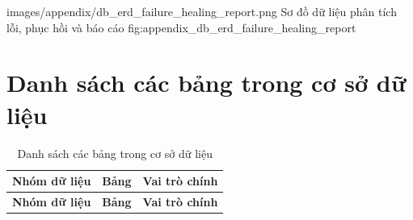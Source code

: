 \appendixERDFigure
{images/appendix/db_erd_failure_healing_report.png}
{Sơ đồ dữ liệu phân tích lỗi, phục hồi và báo cáo}
{fig:appendix_db_erd_failure_healing_report}

\clearpage

\section{Danh sách các bảng trong cơ sở dữ liệu}

{\scriptsize
\begin{longtable}{|p{3.2cm}|p{4.3cm}|p{6.7cm}|}
\caption{Danh sách các bảng trong cơ sở dữ liệu}
\label{tab:appendix_database_tables} \\
\hline
\textbf{Nhóm dữ liệu} & \textbf{Bảng} & \textbf{Vai trò chính} \\
\hline
\endfirsthead

\hline
\textbf{Nhóm dữ liệu} & \textbf{Bảng} & \textbf{Vai trò chính} \\
\hline
\endhead


\end{longtable}}

